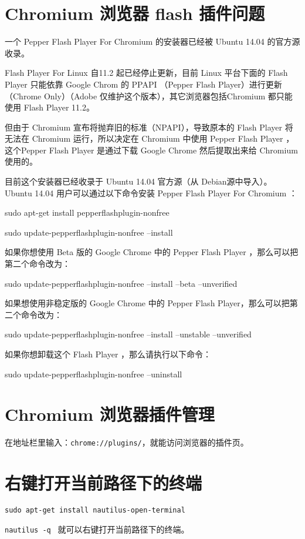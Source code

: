 {\section{Chromium 浏览器 flash 插件问题}
一个 Pepper Flash Player For Chromium 的安装器已经被 Ubuntu 14.04 的官方源收录。

Flash Player For Linux 自11.2 起已经停止更新，目前 Linux 平台下面的 Flash Player 只能依靠 Google Chrom 的 PPAPI （Pepper Flash Player）进行更新（Chrome Only）（Adobe 仅维护这个版本），其它浏览器包括Chromium 都只能使用 Flash Player 11.2。

但由于 Chromium 宣布将抛弃旧的标准（NPAPI），导致原本的 Flash Player 将无法在 Chromium 运行，所以决定在 Chromium 中使用 Pepper Flash Player ，这个Pepper Flash Player 是通过下载 Google Chrome 然后提取出来给 Chromium 使用的。

目前这个安装器已经收录于 Ubuntu 14.04 官方源（从 Debian源中导入）。
Ubuntu 14.04 用户可以通过以下命令安装 Pepper Flash Player For Chromium ：

sudo apt-get install pepperflashplugin-nonfree

sudo update-pepperflashplugin-nonfree --install

如果你想使用 Beta 版的 Google Chrome 中的 Pepper Flash Player ，那么可以把第二个命令改为：

sudo update-pepperflashplugin-nonfree --install --beta --unverified

如果想使用非稳定版的 Google Chrome 中的 Pepper Flash Player，那么可以把第二个命令改为：

sudo update-pepperflashplugin-nonfree --install --unstable --unverified

如果你想卸载这个 Flash Player ，那么请执行以下命令：

sudo update-pepperflashplugin-nonfree --uninstall



\section{Chromium 浏览器插件管理}
在地址栏里输入：\verb|chrome://plugins/|，就能访问浏览器的插件页。


\section{右键打开当前路径下的终端}
\verb|sudo apt-get install nautilus-open-terminal|

\verb|nautilus -q |
就可以右键打开当前路径下的终端。


}
